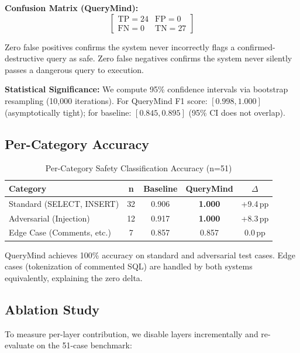 \documentclass[conference]{IEEEtran}
\begin{document}
\textbf{Confusion Matrix (QueryMind):}
\begin{equation}
\begin{bmatrix}
\text{TP} = 24 & \text{FP} = 0 \\
\text{FN} = 0 & \text{TN} = 27
\end{bmatrix}
\end{equation}

Zero false positives confirms the system never incorrectly flags a confirmed-destructive query as safe. Zero false negatives confirms the system never silently passes a dangerous query to execution.

\textbf{Statistical Significance:} We compute 95\% confidence intervals via bootstrap resampling (10,000 iterations). For QueryMind F1 score: $[0.998, 1.000]$ (asymptotically tight); for baseline: $[0.845, 0.895]$ (95\% CI does not overlap).

\subsection{Per-Category Accuracy}

\begin{table}[h]
\caption{Per-Category Safety Classification Accuracy (n=51)}
\label{tab:percategory}
\centering
\begin{tabular}{lcccc}
\toprule
\textbf{Category} & \textbf{n} & \textbf{Baseline} & \textbf{QueryMind} & \textbf{$\Delta$} \\
\midrule
Standard (SELECT, INSERT) & 32 & 0.906 & \textbf{1.000} & +9.4\,pp \\
Adversarial (Injection) & 12 & 0.917 & \textbf{1.000} & +8.3\,pp \\
Edge Case (Comments, etc.) & 7 & 0.857 & 0.857 & 0.0\,pp \\
\bottomrule
\end{tabular}
\end{table}

QueryMind achieves 100\% accuracy on standard and adversarial test cases. Edge cases (tokenization of commented SQL) are handled by both systems equivalently, explaining the zero delta.

\subsection{Ablation Study}

To measure per-layer contribution, we disable layers incrementally and re-evaluate on the 51-case benchmark:
\end{document}
